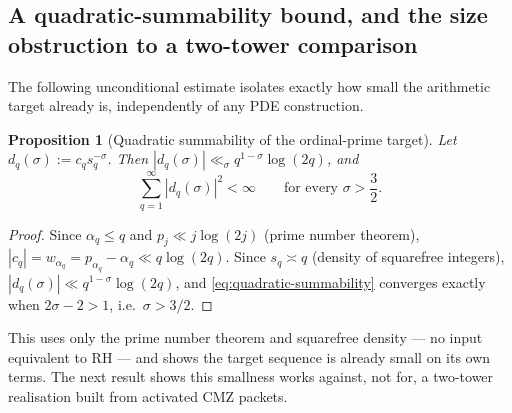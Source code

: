 \documentclass[11pt]{amsart}
\numberwithin{equation}{section}
\theoremstyle{plain}
\newtheorem{proposition}[theorem]{Proposition}
\theoremstyle{definition}
\theoremstyle{remark}
\begin{document}
\subsection{A quadratic-summability bound, and the size obstruction to a two-tower comparison}
\label{subsec:magnitude-obstruction}

The following unconditional estimate isolates exactly how small the
arithmetic target already is, independently of any PDE construction.

\begin{proposition}[Quadratic summability of the ordinal-prime target]
\label{prop:quadratic-summability}
Let $d_q(\sigma):=c_qs_q^{-\sigma}$.  Then $|d_q(\sigma)|\ll_\sigma
q^{1-\sigma}\log(2q)$, and
\begin{equation}
\sum_{q=1}^\infty|d_q(\sigma)|^2<\infty\qquad\text{for every }\sigma>\frac32.
\label{eq:quadratic-summability}
\end{equation}
\end{proposition}

\begin{proof}
Since $\alpha_q\le q$ and $p_j\ll j\log(2j)$ (prime number theorem),
$|c_q|=w_{\alpha_q}=p_{\alpha_q}-\alpha_q\ll q\log(2q)$.  Since $s_q\asymp q$
(density of squarefree integers), $|d_q(\sigma)|\ll q^{1-\sigma}\log(2q)$,
and \eqref{eq:quadratic-summability} converges exactly when $2\sigma-2>1$,
i.e.\ $\sigma>3/2$.
\end{proof}

This uses only the prime number theorem and squarefree density --- no input
equivalent to RH --- and shows the target sequence is already small on its
own terms.  The next result shows this smallness works against, not for, a
two-tower realisation built from activated CMZ packets.
\end{document}
